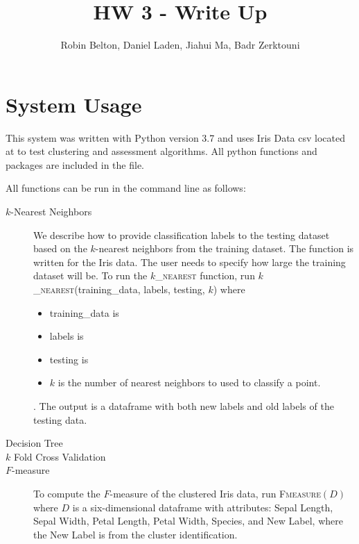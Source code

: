 \documentclass[psamsfonts,onesided,10pt]{amsart}
\title{HW 3 - Write Up}
\author{Robin Belton, Daniel Laden, Jiahui Ma,  Badr Zerktouni}
\begin{document}
\maketitle

\section{System Usage}

This system was written with Python version 3.7 and uses Iris Data csv located at  
to test clustering and assessment algorithms. All python functions and packages are included in the  file.

All functions can be run in the command line as follows:

\begin{description}
\item[$k$-Nearest Neighbors] We describe how to provide classification labels to the testing dataset based on the $k$-nearest neighbors from the training dataset. The function is written for the Iris data. The user needs to specify how large the training dataset will be. To run the \textsc{$k$\_nearest} function, run \textsc{$k$\_nearest}(training\_data, labels, testing, $k$) where 
	\begin{itemize}
	\item training\_data is \todo{}
	\item labels is
	\item testing is
	\item $k$ is the number of nearest neighbors to used to classify a point.
	\end{itemize}. 
The output is a dataframe with both new labels and old labels of the testing data.
\item[Decision Tree] 
\item[$k$ Fold Cross Validation] 
\item[$F$-measure] To compute the $F$-measure of the clustered Iris data, run \textsc{Fmeasure}$(D)$ 
where $D$ is a six-dimensional dataframe with attributes: Sepal Length, Sepal Width, Petal Length, Petal Width,
              Species, and New Label, where the New Label is from the cluster identification. 
\end{description}
 
\end{document}
